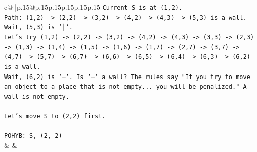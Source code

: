 \documentclass{article}
\begin{document}
{\begin{supertabular}{c@{$\;$}|p{.15\linewidth}@{}p{.15\linewidth}p{.15\linewidth}p{.15\linewidth}p{.15\linewidth}p{.15\linewidth}}
{{{\texttt{Current S is at (1,2).} \\
\texttt{Path: (1,2) {-}> (2,2) {-}> (3,2) {-}> (4,2) {-}> (4,3) {-}> (5,3) is a wall.} \\
\texttt{Wait, (5,3) is `│`.} \\
\texttt{Let's try (1,2) {-}> (2,2) {-}> (3,2) {-}> (4,2) {-}> (4,3) {-}> (3,3) {-}> (2,3) {-}> (1,3) {-}> (1,4) {-}> (1,5) {-}> (1,6) {-}> (1,7) {-}> (2,7) {-}> (3,7) {-}> (4,7) {-}> (5,7) {-}> (6,7) {-}> (6,6) {-}> (6,5) {-}> (6,4) {-}> (6,3) {-}> (6,2) is a wall.} \\
\texttt{Wait, (6,2) is `─`. Is `─` a wall? The rules say "If you try to move an object to a place that is not empty... you will be penalized." A wall is not empty.} \\
\\ 
\texttt{Let's move S to (2,2) first.} \\
\\ 
\texttt{POHYB: S, (2, 2)} \\
            }
        }
    }
    & & \\ \\


\end{supertabular}}
\end{document}
